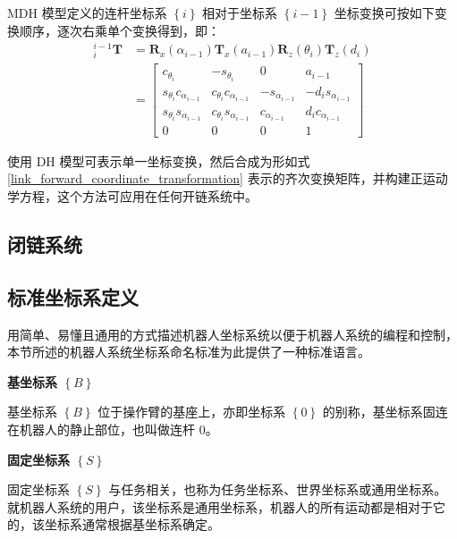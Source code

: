 \documentclass[cn,11pt,chinese,blue,bibstyle=ieeetr]{elegantbook}
\begin{document}
MDH 模型定义的连杆坐标系 $\left\{i\right\}$ 相对于坐标系 $\left\{i-1\right\}$ 坐标变换可按如下变换顺序，逐次右乘单个变换得到，即：
\begin{equation}\label{mdh_model_adjacent_link_forward_coordinate_transformation}
	\begin{aligned}
		{_i^{i-1}\bm{T}} &= \bm{R}_x\left(\alpha_{i-1}\right)\bm{T}_x\left(a_{i-1}\right)\bm{R}_z\left(\theta_i\right)\bm{T}_z\left(d_i\right) \\
		&= \begin{bmatrix}
			c_{\theta_i}               & -s_{\theta_i}              & 0              & a_{i-1} \\
			s_{\theta_i} c_{\alpha_{i-1}} & c_{\theta_i} c_{\alpha_{i-1}} & -s_{\alpha_{i-1}} & -d_i s_{\alpha_{i-1}} \\
			s_{\theta_i} s_{\alpha_{i-1}} & c_{\theta_i} s_{\alpha_{i-1}} & c_{\alpha_{i-1}}  & d_i c_{\alpha_{i-1}} \\
			0                       & 0                       & 0              & 1
		\end{bmatrix}
	\end{aligned}
\end{equation}

使用 DH 模型可表示单一坐标变换，然后合成为形如式 \ref{link_forward_coordinate_transformation} 表示的齐次变换矩阵，并构建正运动学方程，这个方法可应用在任何开链系统中。


\subsection{闭链系统}

\subsection{标准坐标系定义}

用简单、易懂且通用的方式描述机器人坐标系统以便于机器人系统的编程和控制，本节所述的机器人系统坐标系命名标准为此提供了一种标准语言。

\textbf{基坐标系 $\left\{B\right\}$}

基坐标系 $\left\{B\right\}$ 位于操作臂的基座上，亦即坐标系 $\left\{0\right\}$ 的别称，基坐标系固连在机器人的静止部位，也叫做连杆 $0$。

\textbf{固定坐标系 $\left\{S\right\}$}

固定坐标系 $\left\{S\right\}$ 与任务相关，也称为任务坐标系、世界坐标系或通用坐标系。就机器人系统的用户，该坐标系是通用坐标系，机器人的所有运动都是相对于它的，该坐标系通常根据基坐标系确定。
\end{document}
